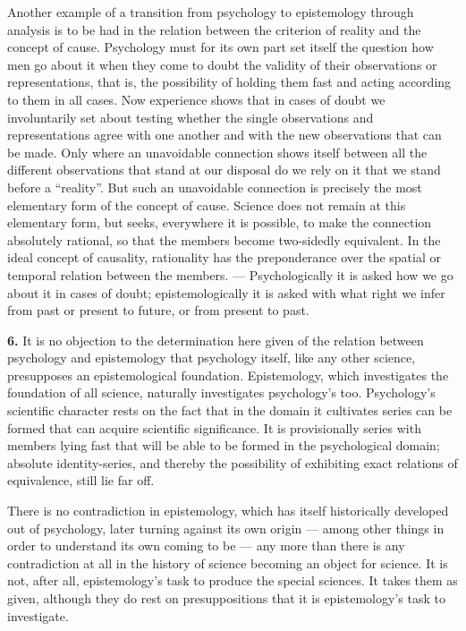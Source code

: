 \documentclass[12pt]{book}
\newcommand{\hnum}[1]{\textbf{#1.}\enspace}
\newcommand{\opage}[1]{\marginnote{\footnotesize\textit{[#1]}}}
\begin{document}
Another example of a transition from psychology to epistemology through analysis
is to be had in the relation between the criterion of reality and the concept of
cause. Psychology must for its own part set itself the question how men go about
it when they come to doubt the validity of their observations or
representations, that is, the possibility of holding them fast and acting
according to them in all cases. Now experience shows that in cases of doubt we
involuntarily set about testing whether the single observations and
representations agree with one another and with the new observations that can be
made. Only where an unavoidable connection shows itself between all the
different observations that stand at our disposal do we rely on it that we stand
before a ``reality''. But such an unavoidable connection is precisely the most
elementary form of the concept of cause. Science does not remain at this
elementary form, but seeks, everywhere it is possible, to make the connection
absolutely rational, so that the members become two-sidedly equivalent. In the
ideal concept of causality, rationality has the preponderance over the spatial
or temporal relation between the members. --- Psychologically it is asked how we
go about it in cases of doubt; epistemologically it is asked with what right we
infer from past or present to future, or from present to past.

\hnum{6} It is no objection to the determination here given of the relation
between psychology and epistemology that psychology itself, like any other
science, pre\-sup\-poses an epis\-te\-mo\-logical foundation. Epistemology, which
investigates the foundation of all science, naturally investigates psychology's
too. Psychology's scientific character rests on the fact that in the domain it
cultivates series can be formed that can acquire scientific significance. It is
provisionally series with members lying fast that will be able to be formed in
the psychological \opage{18}domain; absolute identity-series, and thereby the possibility
of exhibiting exact relations of equivalence, still lie far off.

There is no contradiction in epistemology, which has itself historically
developed out of psychology, later turning against its own origin --- among
other things in order to understand its own coming to be --- any more than there
is any contradiction at all in the history of science becoming an object for
science. It is not, after all, epistemology's task to produce the special
sciences. It takes them as given, although they do rest on presuppositions that
it is epistemology's task to investigate.
\end{document}
